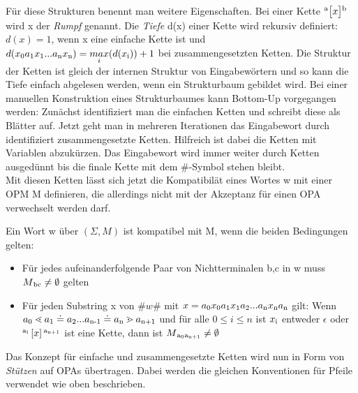 Für diese Strukturen benennt man weitere Eigenschaften. Bei einer Kette $\textsuperscript{a} \big[ x \big] \textsuperscript{b}$ wird x der \textit{Rumpf} genannt. Die \textit{Tiefe} d(x) einer Kette wird rekursiv definiert: $d(x) = 1$, wenn x eine einfache Kette ist und $d(x\textsubscript{0}a\textsubscript{1} x\textsubscript{1}...a\textsubscript{n} x\textsubscript{n}) = \underset{i}{max}(d(x\textsubscript{i})) + 1$ bei zusammengesetzten Ketten. Die Struktur der Ketten ist gleich der internen Struktur von Eingabewörtern und so kann die Tiefe einfach abgelesen werden, wenn ein Strukturbaum gebildet wird. Bei einer manuellen Konstruktion eines Strukturbaumes kann Bottom-Up vorgegangen werden: Zunächst identifiziert man die einfachen Ketten und schreibt diese als Blätter auf. Jetzt geht man in mehreren Iterationen das Eingabewort durch identifiziert zusammengesetzte Ketten. Hilfreich ist dabei die Ketten mit Variablen abzukürzen. Das Eingabewort wird immer weiter durch Ketten ausgedünnt bis die finale Kette mit dem $\#$-Symbol stehen bleibt. \\
Mit diesen Ketten lässt sich jetzt die Kompatibilät eines Wortes w mit einer OPM M definieren, die allerdings nicht mit der Akzeptanz für einen OPA verwechselt werden darf.
\begin{definition}
Ein Wort w über $(\Sigma, M)$ ist kompatibel mit M, wenn die beiden Bedingungen gelten:
\begin{itemize}
\item
Für jedes aufeinanderfolgende Paar von Nichtterminalen b,c in w muss $M\textsubscript{bc}\neq \emptyset$ gelten
\item
Für jeden Substring x von $\# w\#$ mit $x=a\textsubscript{0}x\textsubscript{0}a\textsubscript{1}x\textsubscript{1}a\textsubscript{2}...a\textsubscript{n}x\textsubscript{n}a\textsubscript{n}$ gilt: Wenn $a\textsubscript{0} \lessdot a\textsubscript{1} \doteq a\textsubscript{2}...a\textsubscript{n-1} \doteq a\textsubscript{n} \gtrdot a\textsubscript{n+1}$ und für alle $0 \leq i \leq n$ ist $x\textsubscript{i}$ entweder $\epsilon$ oder $\textsuperscript{a\textsubscript{i}} \left[ x \right] \textsuperscript{a\textsubscript{n+1}}$ ist eine Kette, dann ist $M\textsubscript{a\textsubscript{0}a\textsubscript{n+1}} \neq \emptyset$
\end{itemize}
\end{definition}

Das Konzept für einfache und zusammengesetzte Ketten wird nun in Form von \textit{Stützen} auf OPAs übertragen. Dabei werden die gleichen Konventionen für Pfeile verwendet wie oben beschrieben.

